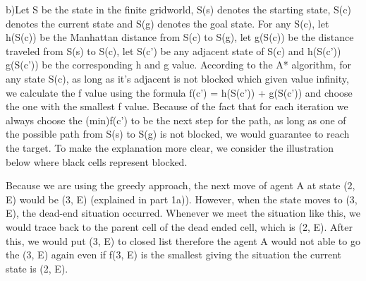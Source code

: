 \documentclass{article}
\begin{document}
b)Let S be the state in the finite gridworld, S{\small (s)} denotes the starting state, S{\small (c)} denotes the current state and S{\small (g)} denotes the goal state. For any S{\small (c)}, let h(S{\small (c)}) be the Manhattan distance from S{\small (c)} to S{\small (g)}, let g(S{\small (c)}) be the distance traveled from S{\small (s)} to S{\small (c)}, let S{\small (c')} be any adjacent state of S{\small (c)} and h(S{\small (c')}) g(S{\small (c')}) be the corresponding h and g value. According to the A* algorithm, for any state S{\small (c)}, as long as it's adjacent is not blocked which given value infinity, we calculate the f value using the formula f{\small (c')} = h(S{\small (c')}) + g(S{\small (c')}) and choose the one with the smallest f value. Because of the fact that for each iteration we always choose the {\tiny (min)}f{\small (c')} to be the next step for the path, as long as one of the possible path from S{\small (s)} to S{\small (g)} is not blocked, we would guarantee to reach the target. To make the explanation more clear, we consider the illustration below where black cells represent blocked.

\vspace{5mm} %

\begingroup
\centering


\endgroup

\vspace{5mm} %

Because we are using the greedy approach, the next move of agent A at state (2, E) would be (3, E) (explained in part 1a)). However, when the state moves to (3, E), the dead-end situation occurred. Whenever we meet the situation like this, we would trace back to the parent cell of the dead ended cell, which is (2, E). After this, we would put (3, E) to closed list therefore the agent A would not able to go the (3, E) again even if f(3, E) is the smallest giving the situation the current state is (2, E).
\hspace{5mm}
\end{document}

